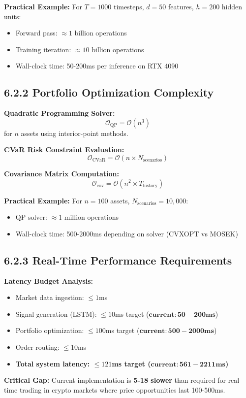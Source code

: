 \documentclass[11pt]{article}
\begin{document}
\textbf{Practical Example:} For $T=1000$ timesteps, $d=50$ features, $h=200$ hidden units:
\begin{itemize}
\item Forward pass: $\approx 1$ billion operations  
\item Training iteration: $\approx 10$ billion operations
\item Wall-clock time: 50-200ms per inference on RTX 4090

\end{itemize}
\subsection{6.2.2 Portfolio Optimization Complexity}

\textbf{Quadratic Programming Solver:}
\begin{equation}
\mathcal{O}_{\text{QP}} = \mathcal{O}(n^3)
\end{equation}
for $n$ assets using interior-point methods.

\textbf{CVaR Risk Constraint Evaluation:}
\begin{equation}
\mathcal{O}_{\text{CVaR}} = \mathcal{O}(n \times N_{\text{scenarios}})
\end{equation}

\textbf{Covariance Matrix Computation:}
\begin{equation}
\mathcal{O}_{\text{cov}} = \mathcal{O}(n^2 \times T_{\text{history}})
\end{equation}

\textbf{Practical Example:} For $n=100$ assets, $N_{\text{scenarios}}=10,000$:
\begin{itemize}
\item QP solver: $\approx 1$ million operations
\item Wall-clock time: 500-2000ms depending on solver (CVXOPT vs MOSEK)

\end{itemize}
\subsection{6.2.3 Real-Time Performance Requirements}

\textbf{Latency Budget Analysis:}
\begin{itemize}
\item Market data ingestion: $\leq 1$ms
\item Signal generation (LSTM): $\leq 10$ms target ($\mathbf{current: 50-200ms}$)
\item Portfolio optimization: $\leq 100$ms target ($\mathbf{current: 500-2000ms}$)
\item Order routing: $\leq 10$ms
\item \textbf{Total system latency: $\leq 121$ms target ($\mathbf{current: 561-2211ms}$)}

\end{itemize}
\textbf{Critical Gap:} Current implementation is \textbf{5-18 slower} than required for real-time trading in crypto markets where price opportunities last 100-500ms.
\end{document}
